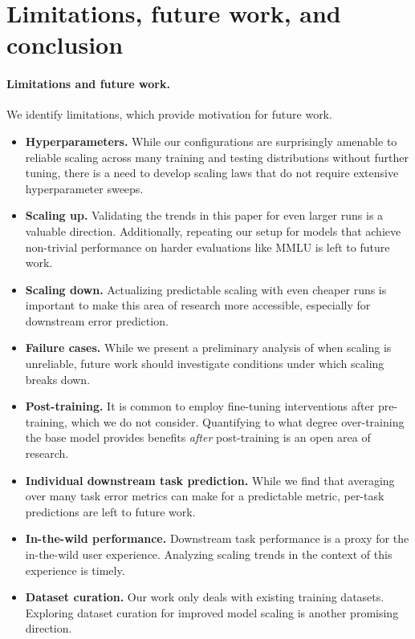 \vspace*{-2mm}
\section{Limitations, future work, and conclusion}
\label{sec:conclusion}

\paragraph{Limitations and future work.}
We identify limitations, which provide motivation for future work.

\begin{itemize}[leftmargin=5mm]
    \vspace*{-1mm}
    \item \textbf{Hyperparameters.}
    While our configurations are surprisingly amenable to reliable scaling across many training and testing distributions without further tuning, there is a need to develop scaling laws that do not require extensive hyperparameter sweeps.
    \vspace*{-1mm}
    \item \textbf{Scaling up.} Validating the trends in this paper for even larger runs is a valuable direction. Additionally, repeating our setup for models that achieve non-trivial performance on harder evaluations like MMLU is left to future work.
    \vspace*{-1mm}
    \item \textbf{Scaling down.} Actualizing predictable scaling with even cheaper runs is important to make this area of research more accessible, especially for downstream error prediction.
    \vspace*{-1mm}
    \item \textbf{Failure cases.} While we present a preliminary analysis of when scaling is unreliable, future work should investigate conditions under which scaling breaks down.
    \vspace*{-1mm}
    \item \textbf{Post-training.} It is common to employ fine-tuning interventions after pre-training, which we do not consider.
    Quantifying to what degree over-training the base model provides benefits \emph{after} post-training is an open area of research.
    \vspace*{-1mm}
    \item \textbf{Individual downstream task prediction.}
    While we find that averaging over many task error metrics can make for a predictable metric, per-task predictions are left to future work.
    \vspace*{-1mm}
    \item  \textbf{In-the-wild performance.}
    Downstream task performance is a proxy for the in-the-wild user experience.
    Analyzing scaling trends in the context of this experience is timely.
    \vspace*{-1mm}
    \item \textbf{Dataset curation.} Our work only deals with existing training datasets.
    Exploring dataset curation for improved model scaling is another promising direction.
    \vspace*{-1mm}
\end{itemize}

